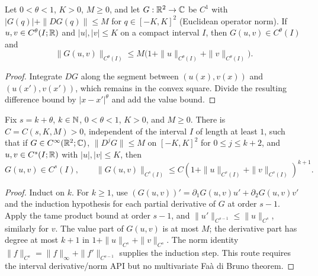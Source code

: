 \begin{lemma}
  \label{lem:c03_holder_composition_base}
  Let $0<\theta<1$, $K>0$, $M\ge0$, and let $G:\mathbb{R}^2\to\mathbb{C}$ be $C^1$ with
  $|G(q)|+\|DG(q)\|\le M$ for $q\in[-K,K]^2$ (Euclidean operator norm).
  If $u,v\in C^\theta(I;\mathbb{R})$ and $|u|,|v|\le K$ on a compact interval $I$, then
  $G(u,v)\in C^\theta(I)$ and
  \[
    \|G(u,v)\|_{C^\theta(I)}\le M\bigl(1+\|u\|_{C^\theta(I)}+
                                                       \|v\|_{C^\theta(I)}\bigr).
  \]
\end{lemma}
\begin{proof}
  Integrate $DG$ along the segment between $(u(x),v(x))$ and $(u(x'),v(x'))$,
  which remains in the convex square. Divide the resulting difference bound by
  $|x-x'|^\theta$ and add the value bound.
\end{proof}

\begin{lemma}
  \label{lem:c03_holder_composition_higher}
  Fix $s=k+\theta$, $k\in\mathbb{N}$, $0<\theta<1$, $K>0$, and $M\ge0$.
  There is $C=C(s,K,M)>0$, independent of the interval $I$ of length at least $1$,
  such that if $G\in C^\infty(\mathbb{R}^2;\mathbb{C})$, $\|D^jG\|\le M$ on $[-K,K]^2$
  for $0\le j\le k+2$, and $u,v\in C^s(I;\mathbb{R})$ with $|u|,|v|\le K$, then
  \[
    G(u,v)\in C^s(I),\qquad
    \|G(u,v)\|_{C^s(I)}\le C(1+\|u\|_{C^s(I)}+\|v\|_{C^s(I)})^{k+1}.
  \]
\end{lemma}
\begin{proof}
  Induct on $k$. For $k\ge1$, use
  $(G(u,v))'=\partial_1G(u,v)u'+\partial_2G(u,v)v'$ and the induction hypothesis
  for each partial derivative of $G$ at order $s-1$. Apply the tame product bound at order
  $s-1$, and $\|u'\|_{C^{s-1}}\le\|u\|_{C^s}$, similarly for $v$.
  The value part of $G(u,v)$ is at most $M$; the derivative part has degree at most $k+1$
  in $1+\|u\|_{C^s}+\|v\|_{C^s}$. The norm identity
  $\|f\|_{C^s}=\|f\|_\infty+\|f'\|_{C^{s-1}}$ supplies the induction step.
  This route requires the interval derivative/norm API but no multivariate Fa\`a di Bruno theorem.
\end{proof}

